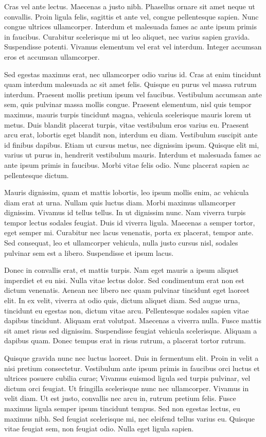 \documentclass[10pt,landscape, a4paper]{article}
\begin{document}
\begin{multicols}{4}
Cras vel ante lectus. Maecenas a justo nibh. Phasellus ornare sit amet neque ut convallis. Proin ligula felis, sagittis et ante vel, congue pellentesque sapien. Nunc congue ultrices ullamcorper. Interdum et malesuada fames ac ante ipsum primis in faucibus. Curabitur scelerisque mi ut leo aliquet, nec varius sapien gravida. Suspendisse potenti. Vivamus elementum vel erat vel interdum. Integer accumsan eros et accumsan ullamcorper.

Sed egestas maximus erat, nec ullamcorper odio varius id. Cras at enim tincidunt quam interdum malesuada ac sit amet felis. Quisque eu purus vel massa rutrum interdum. Praesent mollis pretium ipsum vel faucibus. Vestibulum accumsan ante sem, quis pulvinar massa mollis congue. Praesent elementum, nisl quis tempor maximus, mauris turpis tincidunt magna, vehicula scelerisque mauris lorem ut metus. Duis blandit placerat turpis, vitae vestibulum eros varius eu. Praesent arcu erat, lobortis eget blandit non, interdum eu diam. Vestibulum suscipit ante id finibus dapibus. Etiam ut cursus metus, nec dignissim ipsum. Quisque elit mi, varius ut purus in, hendrerit vestibulum mauris. Interdum et malesuada fames ac ante ipsum primis in faucibus. Morbi vitae felis odio. Nunc placerat sapien ac pellentesque dictum.

Mauris dignissim, quam et mattis lobortis, leo ipsum mollis enim, ac vehicula diam erat at urna. Nullam quis luctus diam. Morbi maximus ullamcorper dignissim. Vivamus id tellus tellus. In ut dignissim nunc. Nam viverra turpis tempor lectus sodales feugiat. Duis id viverra ligula. Maecenas a semper tortor, eget semper mi. Curabitur nec lacus venenatis, porta ex placerat, tempor ante. Sed consequat, leo et ullamcorper vehicula, nulla justo cursus nisl, sodales pulvinar sem est a libero. Suspendisse et ipsum lacus.

Donec in convallis erat, et mattis turpis. Nam eget mauris a ipsum aliquet imperdiet et eu nisi. Nulla vitae lectus dolor. Sed condimentum erat non est dictum venenatis. Aenean nec libero nec quam pulvinar tincidunt eget laoreet elit. In ex velit, viverra at odio quis, dictum aliquet diam. Sed augue urna, tincidunt eu egestas non, dictum vitae arcu. Pellentesque sodales sapien vitae dapibus tincidunt. Aliquam erat volutpat. Maecenas a viverra nulla. Fusce mattis sit amet risus sed dignissim. Suspendisse feugiat vehicula scelerisque. Aliquam a dapibus quam. Donec tempus erat in risus rutrum, a placerat tortor rutrum.

Quisque gravida nunc nec luctus laoreet. Duis in fermentum elit. Proin in velit a nisi pretium consectetur. Vestibulum ante ipsum primis in faucibus orci luctus et ultrices posuere cubilia curae; Vivamus euismod ligula sed turpis pulvinar, vel dictum orci feugiat. Ut fringilla scelerisque nunc nec ullamcorper. Vivamus in velit diam. Ut est justo, convallis nec arcu in, rutrum pretium felis. Fusce maximus ligula semper ipsum tincidunt tempus. Sed non egestas lectus, eu maximus nibh. Sed feugiat scelerisque mi, nec eleifend tellus varius eu. Quisque vitae feugiat sem, non feugiat odio. Nulla eget ligula sapien.

\end{multicols}
\end{document}
